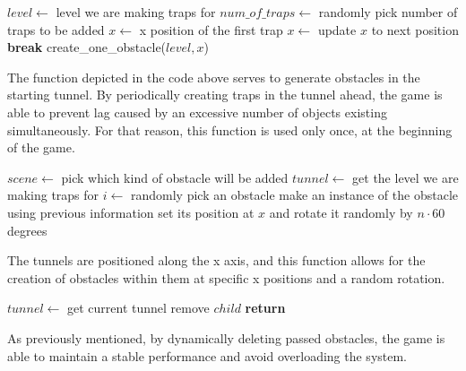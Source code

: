 \begin{algorithm}
\begin{algorithmic}[1]
\State $level \gets$ level we are making traps for
\State $num\_of\_traps \gets$ randomly pick number of traps to be added
\State $x \gets$ x position of the first trap
    \State $x \gets$ update $x$ to next position
        \State \textbf{break}
    \EndIf
    \State create\_one\_obstacle($level, x$)
\EndFor
\EndFunction
\end{algorithmic}
\end{algorithm}

The function depicted in the code above serves to generate obstacles in the starting tunnel. By periodically creating traps in the tunnel ahead, the game is able to prevent lag caused by an excessive number of objects existing simultaneously. For that reason, this function is used only once, at the beginning of the game.

\begin{algorithm}
\begin{algorithmic}[1]
\State $scene \gets $ pick which kind of obstacle will be added
\State $tunnel \gets$ get the level we are making traps for
\State $i \gets$ randomly pick an obstacle
\State make an instance of the obstacle using previous information
\State set its position at $x$ and rotate it randomly by $n \cdot 60$ degrees
\EndFunction\
\end{algorithmic}
\end{algorithm}

The tunnels are positioned along the x axis, and this function allows for the creation of obstacles within them at specific x positions and a random rotation.

\begin{algorithm}
\begin{algorithmic}[1]
\State $tunnel \gets$ get current tunnel
\State remove $child$
\Else
\State \textbf{return}
\EndIf
\EndIf
\EndFor
\EndFunction
\end{algorithmic}
\end{algorithm}

As previously mentioned, by dynamically deleting passed obstacles, the game is able to maintain a stable performance and avoid overloading the system.